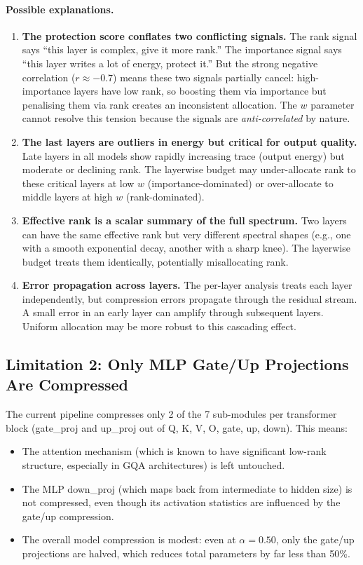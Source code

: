 \documentclass[11pt]{article}
\begin{document}
\paragraph{Possible explanations.}
\begin{enumerate}
    \item \textbf{The protection score conflates two conflicting signals.}  The rank signal says ``this layer is complex, give it more rank.''  The importance signal says ``this layer writes a lot of energy, protect it.''  But the strong negative correlation ($r \approx -0.7$) means these two signals partially cancel: high-importance layers have low rank, so boosting them via importance but penalising them via rank creates an inconsistent allocation.  The $w$ parameter cannot resolve this tension because the signals are \emph{anti-correlated} by nature.
    \item \textbf{The last layers are outliers in energy but critical for output quality.}  Late layers in all models show rapidly increasing trace (output energy) but moderate or declining rank.  The layerwise budget may under-allocate rank to these critical layers at low $w$ (importance-dominated) or over-allocate to middle layers at high $w$ (rank-dominated).
    \item \textbf{Effective rank is a scalar summary of the full spectrum.}  Two layers can have the same effective rank but very different spectral shapes (e.g., one with a smooth exponential decay, another with a sharp knee).  The layerwise budget treats them identically, potentially misallocating rank.
    \item \textbf{Error propagation across layers.}  The per-layer analysis treats each layer independently, but compression errors propagate through the residual stream.  A small error in an early layer can amplify through subsequent layers.  Uniform allocation may be more robust to this cascading effect.
\end{enumerate}

\subsection{Limitation 2: Only MLP Gate/Up Projections Are Compressed}

The current pipeline compresses only 2 of the 7 sub-modules per transformer block (gate\_proj and up\_proj out of Q, K, V, O, gate, up, down).  This means:
\begin{itemize}
    \item The attention mechanism (which is known to have significant low-rank structure, especially in GQA architectures) is left untouched.
    \item The MLP down\_proj (which maps back from intermediate to hidden size) is not compressed, even though its activation statistics are influenced by the gate/up compression.
    \item The overall model compression is modest: even at $\alpha=0.50$, only the gate/up projections are halved, which reduces total parameters by far less than 50\%.
\end{itemize}
\end{document}
